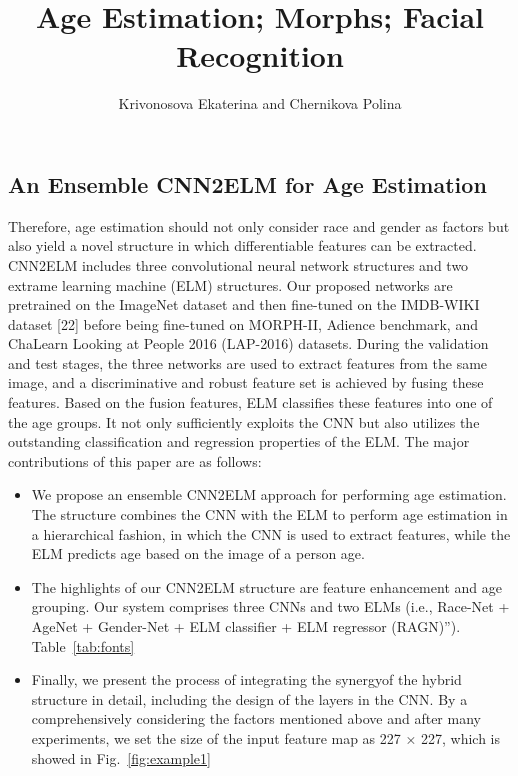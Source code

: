 \documentclass[12pt]{spieman}
\title{Age Estimation; Morphs; Facial Recognition}
\author{Krivonosova Ekaterina and Chernikova Polina}
\affil{Samara University}
\begin{document}
 

\tableofcontents
\maketitle

\begin{spacing}{2}   %

\section{An Ensemble CNN2ELM for Age Estimation}
\label{sect:intro}  %
Therefore, age estimation should not only consider race and gender as factors but also yield a novel structure in which differentiable features can be extracted. CNN2ELM includes three convolutional neural network  structures and two extrame learning machine (ELM) structures. Our proposed networks are pretrained on the ImageNet dataset and then fine-tuned on the IMDB-WIKI dataset [22] before being fine-tuned on MORPH-II, Adience benchmark, and ChaLearn Looking at People 2016 (LAP-2016) datasets. During the validation and test stages, the three networks are used to extract features from the same image, and a discriminative and robust feature set is achieved by fusing these features. Based on the fusion features, ELM classifies these features into one of the age groups. It not only sufficiently exploits the CNN but also utilizes the outstanding classification and regression properties of the ELM. The major contributions of this paper are as follows: 

\begin{itemize}
  \item {We propose an ensemble CNN2ELM approach for performing age estimation. The structure combines the CNN with the ELM to perform age estimation in a hierarchical fashion, in which the CNN is used to extract features, while the ELM predicts age based on the image of a person age.}
  \item The highlights of our CNN2ELM structure are feature enhancement and age grouping. Our system comprises three CNNs and two ELMs (i.e., Race-Net + AgeNet + Gender-Net + ELM classifier + ELM regressor (RAGN)”). Table~\ref{tab:fonts}
  \item Finally, we present the process of integrating the synergyof the hybrid structure in detail, including the design of the layers in the CNN. By a comprehensively considering the factors mentioned above and after many experiments, we set the size of the input feature map as 227 × 227, which is showed in Fig.~\ref{fig:example1}
\end{itemize}


\end{spacing}
\end{document}

